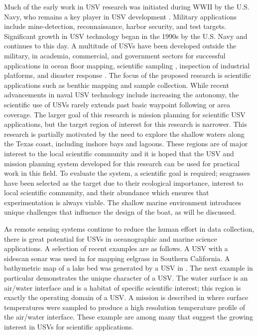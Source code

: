 \documentclass{tamuccthesis}
\begin{document}
Much of the early work in USV research was initiated during WWII by the U.S. Navy, who remains a key player in USV development \cite{bertram2008unmanned}. Military applications include mine-detection, reconnaissance, harbor security, and test targets. Significant growth in USV technology began in the 1990s by the U.S. Navy and continues to this day. A multitude of USVs have been developed outside the military, in academia, commercial, and government \cite{manley2008unmanned} sectors for successful applications in ocean floor mapping, scientific sampling \cite{cokelet2015use}, inspection of industrial platforms, and disaster response \cite{murphy2009robot}. The focus of the proposed research is scientific applications such as benthic mapping and sample collection. While recent advancements in naval USV technology include increasing the autonomy, the scientific use of USVs rarely extends past basic waypoint following or area coverage. The larger goal of this research is mission planning for scientific USV applications, but the target region of interest for this research is narrower. This research is partially motivated by the need to explore the shallow waters along the Texas coast, including inshore bays and lagoons. These regions are of major interest to the local scientific community and it is hoped that the USV and mission planning system developed for this research can be used for practical work in this field. To evaluate the system, a scientific goal is required; seagrasses have been selected as the target due to their ecological importance, interest to local scientific community, and their abundance which ensures that experimentation is always viable. The shallow marine environment introduces unique challenges that influence the design of the boat, as will be discussed. 

As remote sensing systems continue to reduce the human effort in data collection, there is great potential for USVs in oceanographic and marine science applications. A selection of recent examples are as follows. A USV with a sidescan sonar was used in \cite{klemens2017development} for mapping eelgrass in Southern California. A bathymetric map of a lake bed was generated by a USV in \cite{watanabe2016field}. The next example in particular demonstrates the unique character of a USV. The water surface is an air/water interface and is a habitat of specific scientific interest; this region is exactly the operating domain of a USV. A mission is described in \cite{powers2017mobile} where surface temperatures were sampled to produce a high resolution temperature profile of the air/water interface. These example are among many that suggest the growing interest in USVs for scientific applications. 
\end{document}
